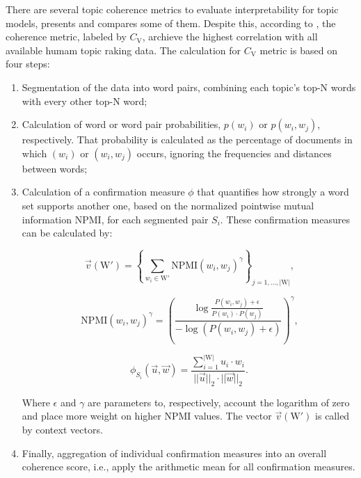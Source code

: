 	There are several topic coherence metrics to evaluate interpretability for topic models,  presents and compares some of them.
	Despite this, according to , the coherence metric, labeled by $C_{\text{V}}$, archieve the highest correlation with all available humam topic raking data. The calculation for $C_{\text{V}}$ metric is based on four steps:
	
	\begin{enumerate}
		\item Segmentation of the data into word pairs, combining each topic's top-N words with every other top-N word;
		
		\item Calculation of word or word pair probabilities, $p(w_{i})$ or $p(w_{i}, w_{j})$, respectively. That probability is calculated as the percentage of documents in which $(w_{i})$ or $(w_{i},w_{j})$ occurs, ignoring the frequencies and distances between words;
		
		\item Calculation of a confirmation measure $\phi$ that quantifies how strongly a word set supports another one, based on the normalized pointwise mutual information $\text{NPMI}$, for each segmented pair $S_{i}$. These confirmation measures can be calculated by:
		
		\begin{equation}
			\vec v (\text{W}') = \left\{ \sum_{w_{i} \in \text{W}'} \text{NPMI} (w_{i}, w_{j})^{\gamma} \right\}_{j=1,...,|\text{W}|} \text{,}
		\end{equation}
	
		\begin{equation}
			\text{NPMI} (w_{i}, w_{j})^{\gamma} = \left( \dfrac{\log \frac{P(w_{i}, w_{j}) + \epsilon}{P(w_{i}) \cdot P(w_{j})} }{- \log (P(w_{i}, w_{j}) + \epsilon) } \right)^{\gamma} \text{,}
		\end{equation}
	
		\begin{equation}
			\phi_{S_{i}}(\vec u , \vec w) = \dfrac{ \sum_{i=1}^{|\text{W}|} u_{i} \cdot w_{i} }{||\vec{u}||_{2} \cdot ||\vec{w}||_{2}} \text{.}
		\end{equation}
	
		Where $\epsilon$ and $\gamma$ are parameters to, respectively, account the logarithm of zero and place more weight on higher $\text{NPMI}$ values. The vector $\vec{v}(\text{W}')$ is called by context vectors.
	
		\item Finally, aggregation of individual confirmation measures into an overall coherence score, i.e., apply the arithmetic mean for all confirmation measures.
	\end{enumerate}
	
